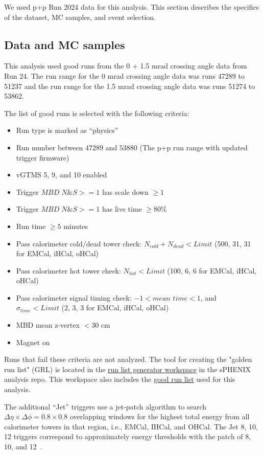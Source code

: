 We used \mbox{p+p}\xspace Run 2024 data for this analysis. This section describes the specifics of the dataset, MC samples, and event selection.

\subsection{Data and MC samples}
This analysis used good runs from the 0 + 1.5 mrad crossing angle data from Run 24. The run range for the 0 mrad crossing angle data was runs 47289 to 51237 and the run range for the 1.5 mrad crossing angle data was runs 51274 to 53862.

The list of good runs is selected with the following criteria:
\begin{itemize}
    \item Run type is marked as ``physics''
    \item Run number between $47289$ and $53880$ (The p+p run range with updated trigger firmware)
    \item vGTMS 5, 9, and 10 enabled
    \item Trigger $MBD\; N\&S >= 1$ has scale down $\geq 1$
    \item Trigger $MBD\; N\&S >= 1$ has live time $\geq 80\%$
    \item Run time $\geq 5$ minutes
    \item Pass calorimeter cold/dead tower check: $N_{cold} + N_{dead} < Limit$ (500, 31, 31 for EMCal, iHCal, oHCal)
    \item Pass calorimeter hot tower check: $N_{hot} < Limit$ (100, 6, 6 for EMCal, iHCal, oHCal)
    \item Pass calorimeter signal timing check: $-1 < \textit{mean time} < 1$, and $\sigma_{time} < Limit$ (2, 3, 3 for EMCal, iHCal, oHCal)
    \item MBD mean z-vertex $< 30$ cm
    \item Magnet on
\end{itemize}
Runs that fail these criteria are not analyzed. The tool for creating the "golden run list" (GRL) is located in the \href{https://github.com/sPHENIX-Collaboration/analysis/tree/master/runListGeneration/Run2024pp}{run list generator workspace} in the sPHENIX analysis repo. This workspace also includes the \href{https://github.com/sPHENIX-Collaboration/analysis/tree/master/runListGeneration/Run2024pp/Full\_ppGoldenRunList\_Version3.list}{ good run list} used for this analysis.

The additional ``Jet'' triggers use a jet-patch algorithm to search $\Delta\eta \times \Delta\phi = 0.8 \times 0.8$ overlapping windows for the highest total energy from all calorimeter towers in that region, i.e., EMCal, IHCal, and OHCal. The Jet 8, 10, 12 triggers correspond to approximately energy thresholds with the patch of 8, 10, and 12~\GeV.

